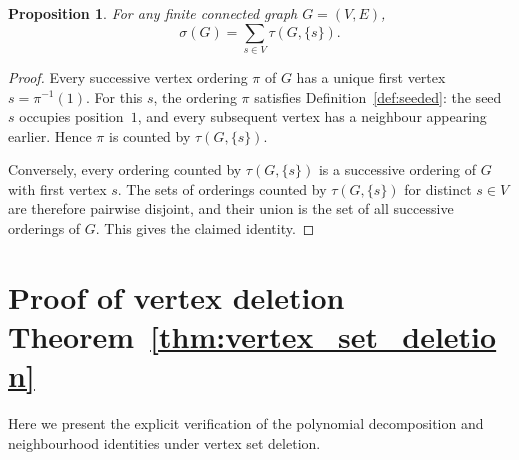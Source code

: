 \documentclass[11pt,a4paper]{article}
\numberwithin{equation}{section}
\theoremstyle{plain}
\newtheorem{proposition}[theorem]{Proposition}
\theoremstyle{definition}
\theoremstyle{remark}
\begin{document}
\begin{proposition}\label{prop:seed-sum}
For any finite connected graph $G=(V,E)$,
\[
\sigma(G)=\sum_{s\in V}\tau(G,\{s\}).
\]
\end{proposition}

\begin{proof}
Every successive vertex ordering $\pi$ of $G$ has a unique first vertex
$s=\pi^{-1}(1)$. For this $s$, the ordering $\pi$ satisfies
Definition~\ref{def:seeded}: the seed $s$ occupies position~$1$, and every
subsequent vertex has a neighbour appearing earlier. Hence $\pi$ is counted
by $\tau(G,\{s\})$.

Conversely, every ordering counted by $\tau(G,\{s\})$ is a successive ordering
of $G$ with first vertex $s$. The sets of orderings counted by
$\tau(G,\{s\})$ for distinct $s\in V$ are therefore pairwise disjoint, and
their union is the set of all successive orderings of $G$. This gives the
claimed identity.
\end{proof}

\section{Proof of vertex deletion Theorem~\ref{thm:vertex_set_deletion}}
\label{appendix:vertex_deletion}

Here we present the explicit verification of the polynomial decomposition and neighbourhood identities under vertex set deletion.
\end{document}
